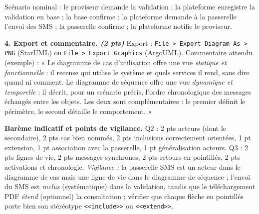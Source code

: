 \documentclass[11pt]{article}
\begin{document}
\begin{corrige}
Scénario nominal : le proviseur demande la validation ; la plateforme enregistre la validation en base ; la base confirme ; la plateforme demande à la passerelle l'envoi des SMS ; la passerelle confirme ; la plateforme notifie le proviseur.

\textbf{4. Export et commentaire. \emph{(2 pts)}} Export : \texttt{File > Export Diagram As > PNG} (StarUML) ou \texttt{File > Export Graphics} (ArgoUML). Commentaire attendu (exemple) : « Le diagramme de cas d'utilisation offre une vue \emph{statique et fonctionnelle} : il recense qui utilise le système et quels services il rend, sans dire quand ni comment. Le diagramme de séquence offre une vue \emph{dynamique et temporelle} : il décrit, pour un scénario précis, l'ordre chronologique des messages échangés entre les objets. Les deux sont complémentaires : le premier définit le périmètre, le second détaille le comportement. »

\textbf{Barème indicatif et points de vigilance.} Q2 : 2 pts acteurs (dont le secondaire), 2 pts cas bien nommés, 2 pts inclusions correctement orientées, 1 pt extension, 1 pt association avec la passerelle, 1 pt généralisation acteurs. Q3 : 2 pts lignes de vie, 2 pts messages synchrones, 2 pts retours en pointillés, 2 pts activations et chronologie. \emph{Vigilance :} la passerelle SMS est un acteur dans le diagramme de cas mais une ligne de vie dans le diagramme de séquence ; l'envoi du SMS est \emph{inclus} (systématique) dans la validation, tandis que le téléchargement PDF \emph{étend} (optionnel) la consultation ; vérifier que chaque flèche en pointillés porte bien son stéréotype \texttt{<<include>>} ou \texttt{<<extend>>}.
\end{corrige}
\end{document}
